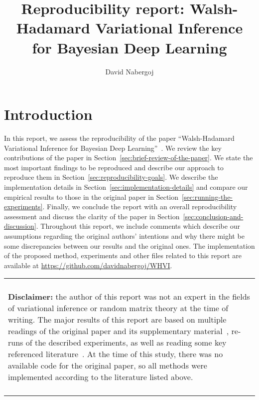 \documentclass[11pt]{article}
\author{David Nabergoj}
\title{Reproducibility report: Walsh-Hadamard Variational Inference for Bayesian Deep Learning}
\newenvironment{disclaimer}
    {
    \begin{center}
    \begin{tabular}{|p{0.9\hsize}|}
    \hline\\
    \begin{footnotesize}\textbf{Disclaimer:}}
    {
    \end{footnotesize}
    \\\\\hline
    \end{tabular}
    \end{center}
    }
\begin{document}
    \maketitle


    \section{Introduction}\label{sec:introduction}
    In this report, we assess the reproducibility of the paper ``Walsh-Hadamard Variational Inference for Bayesian Deep Learning''~\cite{rossi2019walsh}.
    We review the key contributions of the paper in Section~\ref{sec:brief-review-of-the-paper}.
    We state the most important findings to be reproduced and describe our approach to reproduce them in Section~\ref{sec:reproducibility-goals}.
    We describe the implementation details in Section~\ref{sec:implementation-details} and compare our empirical results to those in the original paper in Section~\ref{sec:running-the-experiments}.
    Finally, we conclude the report with an overall reproducibility assessment and discuss the clarity of the paper in Section~\ref{sec:conclusion-and-discussion}.
    Throughout this report, we include comments which describe our assumptions regarding the original authors' intentions and why there might be some discrepancies between our results and the original ones.
    The implementation of the proposed method, experiments and other files related to this report are available at \url{https://github.com/davidnabergoj/WHVI}.

    \begin{disclaimer}
    the author of this report was not an expert in the fields of variational inference or random matrix theory at the time of writing.
    The major results of this report are based on multiple readings of the original paper and its supplementary material~\cite{rossi2019walsh}, re-runs of the described experiments, as well as reading some key referenced literature~\cite{le2014fastfood, blundell2015weight, fino1976unified, kingma2015variational}.
    At the time of this study, there was no available code for the original paper, so all methods were implemented according to the literature listed above.
    \end{disclaimer}
\end{document}
